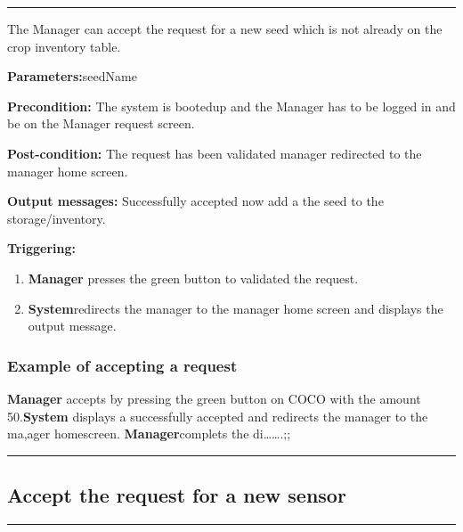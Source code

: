 \hrule
\hfill
\vspace{0.5cm}

\label{operation:Accept a diffrent seed}

The Manager can accept the request for a new seed which is not already on the
crop inventory table.
\begin{description}
\item \textbf{Parameters:}seedName
\item \textbf{Precondition:} The system is bootedup and the Manager has to be
logged in and be on the Manager request screen.
\item \textbf{Post-condition:} The request has been validated manager
redirected to the manager home screen.
\item \item \textbf{Output messages:} Successfully accepted now add a the seed
to the storage/inventory.
\item \textbf{Triggering:}
\begin{enumerate}
\item \textbf{Manager} presses the green button to validated the request.
\item \textbf{System}redirects the manager to the manager home screen and
displays the output message.

\end{enumerate}
\end{description}

\subsubsection{Example of accepting a request}
\textbf{Manager} accepts by pressing the green button on COCO with the amount
50.\textbf{System} displays a successfully accepted and redirects the manager
to the ma,ager homescreen.
\textbf{Manager}complets the di\ldots\ldots.;;
\hfill
\vspace{0.5cm}
\hrule

\break

\subsection{Accept the request for a new sensor}

\hrule
\hfill
\vspace{0.5cm}

\label{operation:Accept the request for a new sensor}

